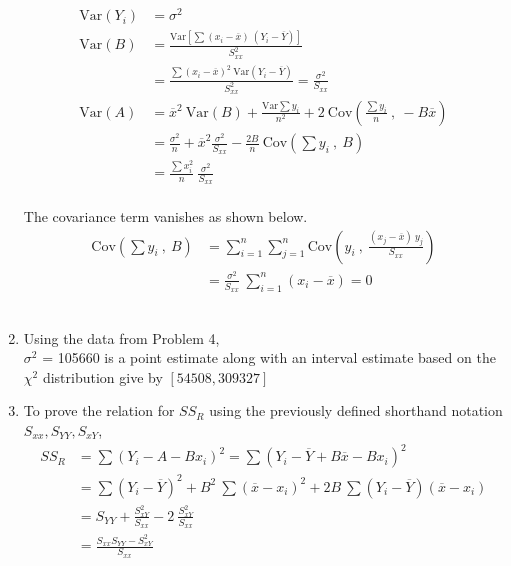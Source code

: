 \begin{enumerate}
\begin{align}
	\mathrm{Var}(Y_i) &= \sigma^2 \nonumber \\
	\mathrm{Var}(B) &= \frac{\mathrm{Var}\left[\sum (x_i - \overline{x})\ (Y_i - \overline{Y})\right]}{S_{xx}^2} \nonumber \\
	&= \frac{\sum (x_i - \overline{x})^2\ \mathrm{Var}(Y_i - \overline{Y})}{S_{xx}^2} = \frac{\sigma^2}{S_{xx}} \\
	\mathrm{Var}(A) &= \overline{x}^2\ \mathrm{Var}(B) + \frac{\mathrm{Var}\sum y_i}{n^2} + 2\ \mathrm{Cov}\left( \frac{\sum y_i}{n}\ ,\  -B \overline{x} \right) \nonumber \\
	&= \frac{\sigma^2}{n} + \overline{x}^2 \frac{\sigma^2}{S_{xx}} - \frac{2B}{n} \ \mathrm{Cov}\left( \sum y_i\ ,\ B \right) \nonumber \\
	&= \frac{\sum x_i^2}{n}\ \frac{\sigma^2}{S_{xx}}
\end{align}\\

The covariance term vanishes as shown below.\\

\begin{align}
	\mathrm{Cov}\left( \sum y_i\ ,\ B \right) &= \sum\limits_{i = 1}^{n} \sum\limits_{j = 1}^{n} \mathrm{Cov}\left( y_i\ ,\ \frac{(x_j - \overline{x})\ y_j}{S_{xx}} \right) \nonumber \\
	&= \frac{\sigma^2}{S_{xx}}\ \sum\limits_{i = 1}^{n} (x_i - \overline{x}) = 0
\end{align}\\


\item Using the data from Problem 4, \\

$ \sigma^2 $ = 105660 is a point estimate along with an interval estimate based on the $ \chi^2 $ distribution give by $ [54508, 309327] $\\

\item To prove the relation for $ SS_R $ using the previously defined shorthand notation\\
 $ S_{xx}, S_{YY}, S_{xY} $, \\

\begin{align}
	SS_R &= \sum (Y_i - A - B x_i)^2 = \sum(Y_i - \overline{Y} + B \overline{x} - B x_i)^2 \\
	&= \sum (Y_i - \overline{Y})^2 + B^2\ \sum (\overline{x} - x_i)^2 + 2B\ \sum (Y_i - \overline{Y})(\overline{x} - x_i) \nonumber \\
	&= S_{YY} + \frac{S_{xY}^2}{S_{xx}} - 2\ \frac{S_{xY}^2}{S_{xx}} \nonumber \\
	&= \frac{S_{xx}S_{YY} - S_{xY}^2}{S_{xx}}
\end{align}\\


\end{enumerate}
